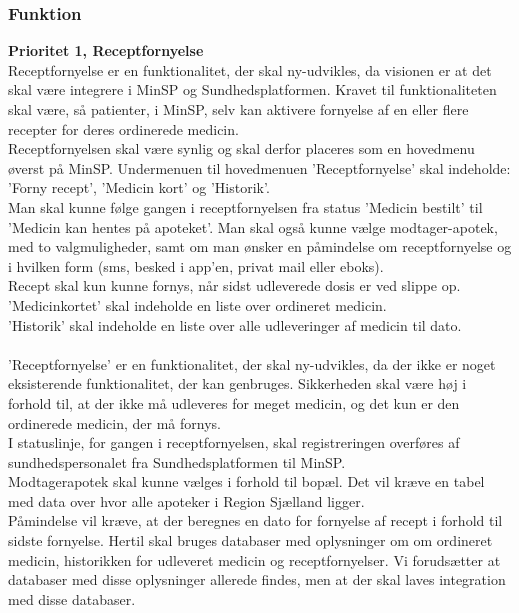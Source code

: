 \subsubsection{Funktion}
\textbf{Prioritet 1, Receptfornyelse}\\
Receptfornyelse er en funktionalitet, der skal ny-udvikles, da visionen er at det skal være integrere i MinSP og Sundhedsplatformen. Kravet til funktionaliteten skal være, så patienter, i MinSP, selv kan aktivere fornyelse af en eller flere recepter for deres ordinerede medicin. 
\\
Receptfornyelsen skal være synlig og skal derfor placeres som en hovedmenu øverst på MinSP. Undermenuen til hovedmenuen 'Receptfornyelse' skal indeholde: 'Forny recept', 'Medicin kort' og 'Historik'.
\\
Man skal kunne følge gangen i receptfornyelsen fra status 'Medicin bestilt' til 'Medicin kan hentes på apoteket'. Man skal også kunne vælge modtager-apotek, med to valgmuligheder, samt om man ønsker en påmindelse om receptfornyelse og i hvilken form (sms, besked i app'en, privat mail eller eboks). 
\\ 
Recept skal kun kunne fornys, når sidst udleverede dosis er ved slippe op.  
\\
'Medicinkortet' skal indeholde en liste over ordineret medicin.\\ 
'Historik' skal indeholde en liste over alle udleveringer af medicin til dato.
\\ \\
'Receptfornyelse' er en funktionalitet, der skal ny-udvikles, da der ikke er noget eksisterende funktionalitet, der kan genbruges. Sikkerheden skal være høj i forhold til, at der ikke må udleveres for meget medicin, og det kun er den ordinerede medicin, der må fornys. \\
I statuslinje, for gangen i receptfornyelsen, skal registreringen overføres af sundhedspersonalet fra Sundhedsplatformen til MinSP.\\
Modtagerapotek skal kunne vælges i forhold til bopæl. Det vil kræve en tabel med data over hvor alle apoteker i Region Sjælland ligger.\\
Påmindelse vil kræve, at der beregnes en dato for fornyelse af recept i forhold til sidste fornyelse. Hertil skal bruges databaser med oplysninger om om ordineret medicin, historikken for udleveret medicin og receptfornyelser. Vi forudsætter at databaser med disse oplysninger allerede findes, men at der skal laves integration med disse databaser.\\
